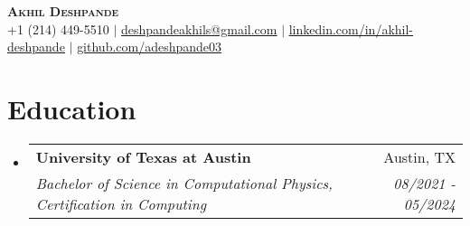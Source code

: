 \documentclass[letterpaper]{article}
\makeatletter
\newcommand{\resumeSubheading}[4]{
  \vspace{-2pt}\item
    \begin{tabular*}{0.97\textwidth}[t]{l@{\extracolsep{\fill}}r}
      \textbf{#1} & #2 \\
      \textit{\small#3} & \textit{\small #4} \\
    \end{tabular*}\vspace{-7pt}
}
\newcommand{\resumeSubHeadingListStart}{\begin{itemize}[leftmargin=0.15in, label={}]}
\newcommand{\resumeSubHeadingListEnd}{\end{itemize}}
\makeatother
\begin{document}

\begin{center}
    \textbf{\Huge \scshape Akhil Deshpande} \\ \vspace{1pt}
    \small +1 (214) 449-5510 $|$ \href{deshpandeakhils@gmail.com}{\underline{deshpandeakhils@gmail.com}} $|$ 
    \href{https://www.linkedin.com/in/akhil-deshpande/}{\underline{linkedin.com/in/akhil-deshpande}} $|$
    \href{https://github.com/adeshpande03}{\underline{github.com/adeshpande03}}
\end{center}


\section{Education}
  \resumeSubHeadingListStart
    \resumeSubheading
      {University of Texas at Austin}{Austin, TX}
      {Bachelor of Science in Computational Physics, Certification in Computing}{08/2021 - 05/2024}
    
  \resumeSubHeadingListEnd
\end{document}

